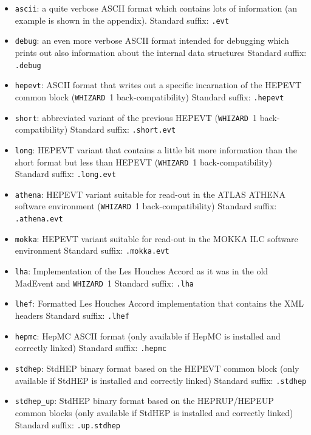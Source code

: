 \documentclass[12pt]{book}
\newcommand{\ttt}[1]{\texttt{#1}}
\newcommand{\whizard}{\texttt{WHIZARD}}
\begin{document}
\begin{itemize}
\item \ttt{ascii}: a quite verbose ASCII format which contains lots of
  information (an example is shown in the appendix). \newline
  Standard suffix: \ttt{.evt} 
\item \ttt{debug}: an even more verbose ASCII format intended for
  debugging which prints out also information about the internal data
  structures \newline
  Standard suffix: \ttt{.debug} 
\item \ttt{hepevt}: ASCII format that writes out a specific
  incarnation of the HEPEVT common block (\whizard~1
  back-compatibility) \newline
  Standard suffix: \ttt{.hepevt} 
\item \ttt{short}: abbreviated variant of the previous HEPEVT (\whizard\
  1 back-compatibility)  \newline
  Standard suffix: \ttt{.short.evt} 
\item \ttt{long}: HEPEVT variant that contains a little bit more
  information than the short format but less than HEPEVT (\whizard\
  1 back-compatibility)  \newline
  Standard suffix: \ttt{.long.evt} 
\item \ttt{athena}: HEPEVT variant suitable for read-out in the ATLAS
  ATHENA software environment (\whizard\
  1 back-compatibility)  \newline
  Standard suffix: \ttt{.athena.evt} 
\item \ttt{mokka}: HEPEVT variant suitable for read-out in the MOKKA
  ILC software environment \newline
  Standard suffix: \ttt{.mokka.evt} 
\item \ttt{lha}: Implementation of the Les Houches Accord as it was in
  the old MadEvent and \whizard~1 \newline
  Standard suffix: \ttt{.lha} 
\item \ttt{lhef}: Formatted Les Houches Accord implementation that
  contains the XML headers \newline
  Standard suffix: \ttt{.lhef}  
\item \ttt{hepmc}: HepMC ASCII format (only available if HepMC is
  installed and correctly linked) \newline
  Standard suffix: \ttt{.hepmc} 
\item \ttt{stdhep}: StdHEP binary format based on the HEPEVT common
  block (only available if StdHEP is installed and correctly linked)
  \newline 
  Standard suffix: \ttt{.stdhep} 
\item \ttt{stdhep\_up}: StdHEP binary format based on the HEPRUP/HEPEUP
  common blocks (only available if StdHEP is installed and correctly
  linked)  \newline
  Standard suffix: \ttt{.up.stdhep} 
\end{itemize}
\end{document}

